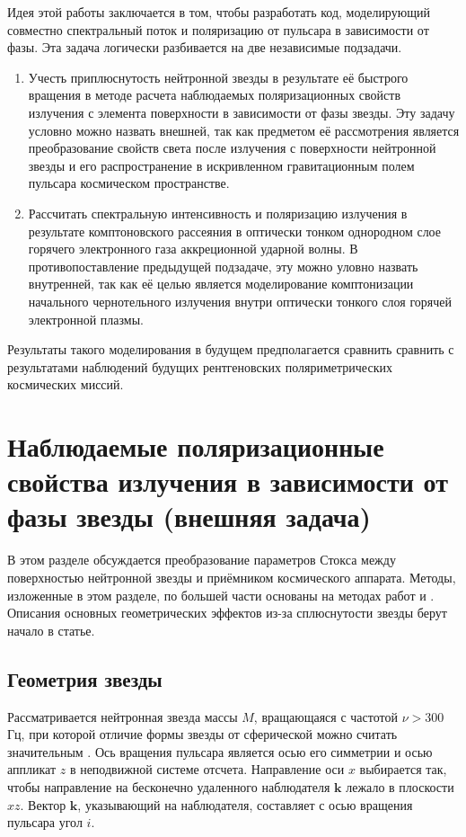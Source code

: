 \documentclass[14pt,a4paper]{extarticle}
\begin{document}
		Идея этой работы заключается  в том, чтобы разработать код, моделирующий совместно спектральный поток и поляризацию от пульсара в зависимости от фазы. 
		Эта задача логически разбивается на две независимые подзадачи. \begin{enumerate}
			\item Учесть приплюснутость нейтронной звезды в результате её быстрого вращения в методе расчета наблюдаемых поляризационных свойств излучения с элемента поверхности в зависимости от фазы звезды. 
			Эту задачу условно можно назвать внешней, так как предметом её рассмотрения является преобразование свойств света после излучения с поверхности нейтронной звезды и его распространение в искривленном гравитационным полем пульсара космическом пространстве. 
			\item Рассчитать спектральную интенсивность и поляризацию излучения в результате комптоновского рассеяния в оптически тонком однородном слое горячего электронного газа аккреционной ударной волны. В противопоставление предыдущей подзадаче, эту можно уловно назвать внутренней, так как её целью является моделирование комптонизации начального чернотельного излучения внутри оптически тонкого слоя горячей электронной плазмы.
		\end{enumerate}

		Результаты такого моделирования в будущем предполагается сравнить сравнить с результатами наблюдений будущих рентгеновских поляриметрических космических миссий.


	\newpage

	\section{Наблюдаемые поляризационные свойства излучения в зависимости от фазы звезды (внешняя задача)}\label{Outer}
		В этом разделе обсуждается преобразование параметров Стокса между поверхностью нейтронной звезды и приёмником космического аппарата. 
		Методы, изложенные в этом разделе, по большей части основаны на методах работ \cite{Viironen2004} и \cite{Poutanen2006}. 
		Описания основных геометрических эффектов из-за сплюснутости звезды  берут начало в статье\cite{Morsink2007}.  

		\subsection{Геометрия звезды}\label{sub:GG}
		    Рассматривается нейтронная звезда массы $M$, вращающаяся с частотой $\nu > 300$ Гц, при которой отличие формы звезды от сферической можно считать значительным \cite{Cadeau2007}. 
		    Ось вращения пульсара является осью его симметрии и осью аппликат $z$ в неподвижной системе отсчета. 
		    Направление оси $x$ выбирается так, чтобы направление на бесконечно удаленного наблюдателя $\bm{k}$ лежало в плоскости $xz$.
		    Вектор $\bm{k}$, указывающий на наблюдателя, составляет с осью вращения пульсара угол $i$. 
\end{document}
